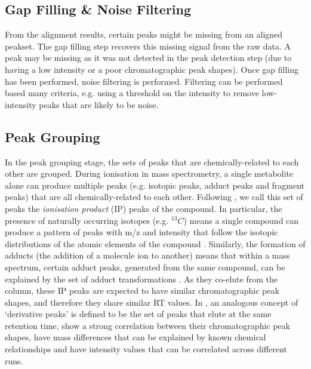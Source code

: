 
\subsection{Gap Filling \& Noise Filtering}

From the alignment results, certain peaks might be missing from an aligned peakset. The gap filling step recovers this missing signal from the raw data. A peak may be missing as it was not detected in the peak detection step (due to having a low intensity or a poor chromatographic peak shapes). Once gap filling has been performed, noise filtering is performed. Filtering can be performed based many criteria, e.g. using a threshold on the intensity to remove low-intensity peaks that are likely to be noise. 

\subsection{Peak Grouping\label{sub:grouping-background}}

In the peak grouping stage, the sets of peaks that are chemically-related to each other are grouped. During ionisation in mass spectrometry, a single metabolite alone can produce multiple peaks (e.g. isotopic peaks, adduct peaks and fragment peaks) that are all chemically-related to each other. Following \cite{Lee2013}, we call this set of peaks the \emph{ionisation product} (IP) peaks of the compound. In particular, the presence of naturally occurring isotopes (e.g. $^{13}C$) means a single compound can produce a pattern of peaks with m/z and intensity that follow the isotopic distributions of the atomic elements of the compound \cite{Snider2007}. Similarly, the formation of adducts (the addition of a molecule ion to another) means that within a mass spectrum, certain adduct peaks, generated from the same compound, can be explained by the set of adduct transformations \cite{Keller2008}. As they co-elute from the column, these IP peaks are expected to have similar chromatographic peak shapes, and therefore they share similar RT values. In \cite{Scheltema2009a}, an analogous concept of `derivative peaks' is defined to be the set of peaks that elute at the same retention time, show a strong correlation between their chromatographic peak shapes, have mass differences that can be explained by known chemical relationships and have intensity values that can be correlated across different runs. 

